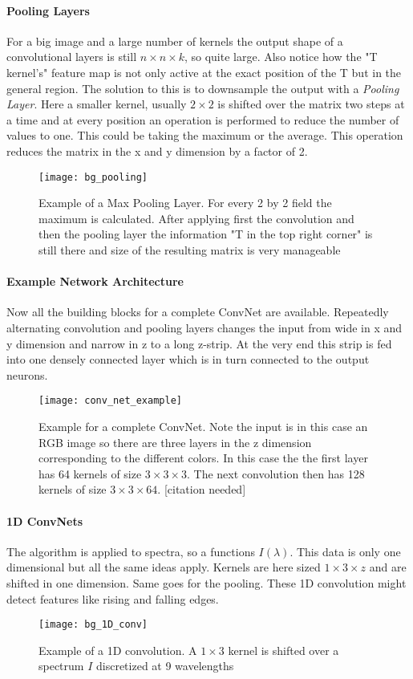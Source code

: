 \paragraph{Pooling Layers}
For a big image and a large number of kernels the output shape of a convolutional layers is still $n \times n \times k$, so quite large. Also notice how the "T kernel's" feature map is not only active at the exact position of the T but in the general region. The solution to this is to downsample the output with a \textit{Pooling Layer}. Here a smaller kernel, usually $2 \times 2$ is shifted over the matrix two steps at a time and at every position an operation is performed to reduce the number of values to one. This could be taking the maximum or the average. This operation reduces the matrix in the x and y dimension by a factor of 2.

\begin{figure}[H]
    \centering
    \texttt{[image: bg\_pooling]}
    \caption{Example of a Max Pooling Layer. For every 2 by 2 field the maximum is calculated. After applying first the convolution and then the pooling layer the information "T in the top right corner" is still there and size of the resulting matrix is very manageable}
    \label{fig:bg:pooling}
\end{figure}

\paragraph{Example Network Architecture}
Now all the building blocks for a complete ConvNet are available. Repeatedly alternating convolution and pooling layers changes the input from wide in x and y dimension and narrow in z to a long z-strip. At the very end this strip is fed into one densely connected layer which is in turn connected to the output neurons.

\begin{figure}[H]
    \centering
    \texttt{[image: conv\_net\_example]}
    \caption{Example for a complete ConvNet. Note the input is in this case an RGB image so there are three layers in the z dimension corresponding to the different colors. In this case the the first layer has 64 kernels of size $3 \times 3 \times 3$. The next convolution then has 128 kernels of size $3 \times 3 \times 64$. [citation needed]}
    \label{fig:bg:NN_example}
\end{figure}

\paragraph{1D ConvNets}
The algorithm is applied to spectra, so a functions $I(\lambda)$. This data is only one dimensional but all the same ideas apply. Kernels are here sized $1 \times 3 \times z$ and are shifted in one dimension. Same goes for the pooling. These 1D convolution might detect features like rising and falling edges.

\begin{figure}[H]
    \centering
    \texttt{[image: bg\_1D\_conv]}
    \caption{Example of a 1D convolution. A $1 \times 3$ kernel is shifted over a spectrum $I$ discretized at 9 wavelengths}
    \label{fig:bg:1D_conv}
\end{figure}
